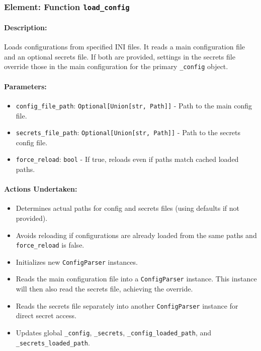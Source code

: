 \documentclass{article}
\begin{document}
\subsubsection{Element: Function \texttt{load\_config}}
\paragraph{Description:} Loads configurations from specified INI files. It reads a main configuration file and an optional secrets file. If both are provided, settings in the secrets file override those in the main configuration for the primary \texttt{\_config} object.
\paragraph{Parameters:}
\begin{itemize}
    \item \texttt{config\_file\_path}: \texttt{Optional[Union[str, Path]]} - Path to the main config file.
    \item \texttt{secrets\_file\_path}: \texttt{Optional[Union[str, Path]]} - Path to the secrets config file.
    \item \texttt{force\_reload}: \texttt{bool} - If true, reloads even if paths match cached loaded paths.
\end{itemize}
\paragraph{Actions Undertaken:}
\begin{itemize}
    \item Determines actual paths for config and secrets files (using defaults if not provided).
    \item Avoids reloading if configurations are already loaded from the same paths and \texttt{force\_reload} is false.
    \item Initializes new \texttt{ConfigParser} instances.
    \item Reads the main configuration file into a \texttt{ConfigParser} instance. This instance will then also read the secrets file, achieving the override.
    \item Reads the secrets file separately into another \texttt{ConfigParser} instance for direct secret access.
    \item Updates global \texttt{\_config}, \texttt{\_secrets}, \texttt{\_config\_loaded\_path}, and \texttt{\_secrets\_loaded\_path}.
\end{itemize}
\end{document}
